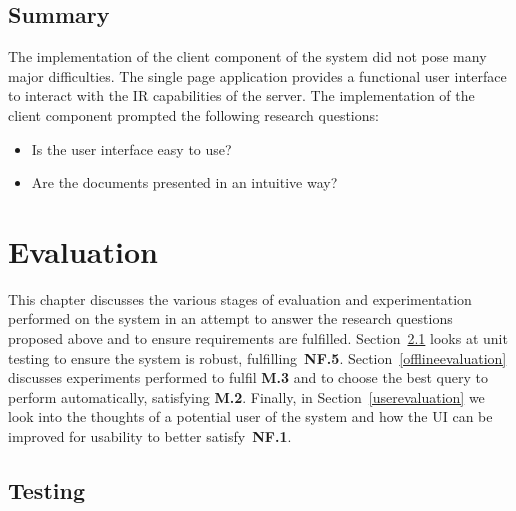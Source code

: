 \documentclass{l4proj}
\begin{document}
\section{Summary} \label{clientsummary}
The implementation of the client component of the system did not pose many major difficulties. The single page application provides a functional user interface to interact with the IR capabilities of the server.
The implementation of the client component prompted the following research questions:
\begin{itemize}
\item Is the user interface easy to use?
\item Are the documents presented in an intuitive way?
\end{itemize}

\chapter{Evaluation} \label{evaluation}
This chapter discusses the various stages of evaluation and experimentation performed on the system in an attempt to answer the research questions proposed above and to ensure requirements are fulfilled.
Section~\ref{testing} looks at unit testing to ensure the system is robust, fulfilling~\textbf{NF.5}.
Section~\ref{offlineevaluation} discusses experiments performed to fulfil \textbf{M.3} and to choose the best query to perform automatically, satisfying \textbf{M.2}.
Finally, in Section~\ref{userevaluation} we look into the thoughts of a potential user of the system and how the UI can be improved for usability to better satisfy~\textbf{NF.1}.
\section{Testing} \label{testing}
\end{document}
